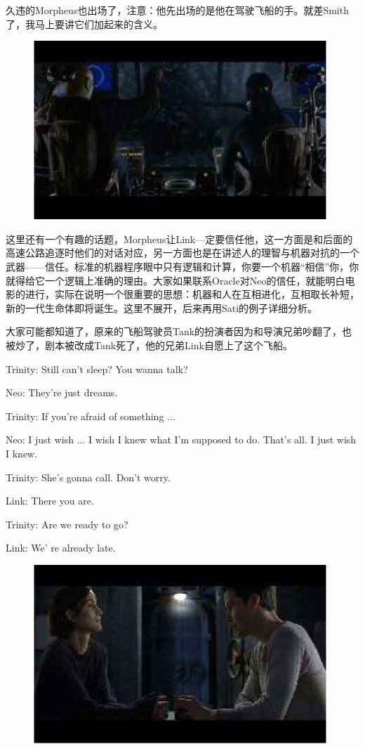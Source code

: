 \documentclass[UTF8]{ctexart}
\newenvironment{myquote}{\color{green} \setlength{\leftskip}{6em} \setlength{\rightskip}{4em} \setlength{\parindent}{-2em}}{\par}
\begin{document}
久违的Morpheus也出场了，注意：他先出场的是他在驾驶飞船的手。就差Smith了，我马上要讲它们加起来的含义。

\begin{figure}[htb]
\centering
\includegraphics[width=0.5\linewidth]{fig/read_reloaded-13}
\end{figure}

这里还有一个有趣的话题，Morpheus让Link—定要信任他，这一方面是和后面的高速公路追逐时他们的对话对应，另一方面也是在讲述人的理智与机器对抗的一个武器——信任。标准的机器程序眼中只有逻辑和计算，你要一个机器“相信”你，你就得给它一个逻辑上准确的理由。大家如果联系Oracle对Neo的信任，就能明白电影的进行，实际在说明一个很重要的思想：机器和人在互相进化，互相取长补短，新的一代生命体即将诞生。这里不展开，后来再用Sati的例子详细分析。

大家可能都知道了，原来的飞船驾驶员Tank的扮演者因为和导演兄弟吵翻了，也被炒了，剧本被改成Tank死了，他的兄弟Link自愿上了这个飞船。

\begin{myquote}
Trinity: Still can't sleep? You wanna talk?

Neo: They're just dreams.

Trinity: If you're afraid of something ...

Neo: I just wish ... I wish I knew what I'm supposed to do. That's all. I just wish I knew.

Trinity: She's gonna call. Don't worry.

Link: There you are.

Trinity: Are we ready to go?

Link: We' re already late.
\end{myquote}

\begin{figure}[htb]
\centering
\includegraphics[width=0.5\linewidth]{fig/read_reloaded-14}
\end{figure}
\end{document}
